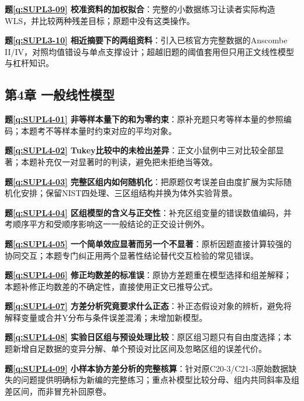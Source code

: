 \noindent\textbf{题\ref*{q:SUPL3-09} 校准资料的加权拟合}：完整的小数据练习让读者实际构造WLS，并比较两种残差目标；原题中没有这类操作。\par

\noindent\textbf{题\ref*{q:SUPL3-10} 相近摘要下的两组资料}：引入已核官方完整数据的Anscombe II/IV，对照均值错设与单点支撑设计；超越旧题的阈值套用但只用正文线性模型与杠杆知识。\par

\subsection*{第4章 一般线性模型}

\noindent\textbf{题\ref*{q:SUPL4-01} 非等样本量下的和为零约束}：原补充题只考等样本量的参照编码；本题考不等样本量时约束对应的平均对象。\par

\noindent\textbf{题\ref*{q:SUPL4-02} Tukey比较中的未检出差异}：正文小鼠例中三对比较全部显著；本题补充仅一对显著时的判读，避免把未拒绝当等效。\par

\noindent\textbf{题\ref*{q:SUPL4-03} 完整区组内如何随机化}：把原题仅考误差自由度扩展为实际随机化安排；保留NIST四处理、三区组结构并换为体外实验背景。\par

\noindent\textbf{题\ref*{q:SUPL4-04} 区组模型的含义与正交性}：补充区组变量的错误数值编码，并考顺序平方和受顺序影响这一一般结论的正交设计例外。\par

\noindent\textbf{题\ref*{q:SUPL4-05} 一个简单效应显著而另一个不显著}：原析因题直接计算较强的协同交互；本题专门纠正用两个显著性结论替代交互检验的常见错误。\par

\noindent\textbf{题\ref*{q:SUPL4-06} 修正均数差的标准误}：原协方差题重在模型选择和组差解释；本题补修正均数差的不确定性，直接使用正文已推导公式。\par

\noindent\textbf{题\ref*{q:SUPL4-07} 方差分析究竟要求什么正态}：补正态假设对象的辨析，避免将解释变量或合并Y分布与条件误差混淆；未增加新模型。\par

\noindent\textbf{题\ref*{q:SUPL4-08} 实验日区组与预设处理比较}：原区组习题只有自由度选择；本题新增自足数据的变异分解、单个预设对比区间及忽略区组的误差代价。\par

\noindent\textbf{题\ref*{q:SUPL4-09} 小样本协方差分析的完整核算}：针对原C20-3/C21-3原始数据缺失的问题提供明确标为新编的完整练习；重点补模型比较分母、组内共同斜率及组差区间，而非冒充补回原卷。\par

